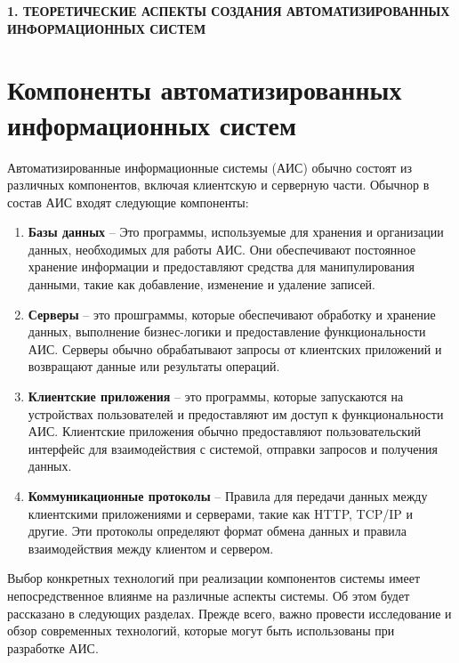 \newpage
\begin{center}
    \textbf{\large 1. ТЕОРЕТИЧЕСКИЕ АСПЕКТЫ СОЗДАНИЯ АВТОМАТИЗИРОВАННЫХ ИНФОРМАЦИОННЫХ СИСТЕМ}
\end{center}



\section{Компоненты автоматизированных информационных систем}
Автоматизированные информационные системы (АИС) обычно состоят из различных компонентов, 
включая клиентскую и серверную части. 
Обычнор в состав АИС входят следующие компоненты:

\begin{enumerate}
    \item \textbf{Базы данных} -- Это программы, используемые для хранения и организации данных, необходимых для работы АИС. 
    Они обеспечивают постоянное хранение информации и предоставляют средства для манипулирования данными, 
    такие как добавление, изменение и удаление записей.
    
    \item \textbf{Серверы} -- это прошграммы, которые обеспечивают обработку и хранение данных, 
    выполнение бизнес-логики и предоставление функциональности АИС. 
    Серверы обычно обрабатывают запросы от клиентских приложений и возвращают данные или результаты операций.
    
    \item \textbf{Клиентские приложения} -- это программы, которые запускаются на устройствах пользователей и предоставляют им доступ к функциональности АИС. 
    Клиентские приложения обычно предоставляют пользовательский интерфейс для взаимодействия с системой, 
    отправки запросов и получения данных.
    
    \item \textbf{Коммуникационные протоколы} -- Правила для передачи данных между клиентскими приложениями и серверами, такие как HTTP, TCP/IP и другие. 
    Эти протоколы определяют формат обмена данных и правила взаимодействия между клиентом и сервером.
\end{enumerate}

Выбор конкретных технологий при реализации компонентов системы имеет непосредственное влиянме на различные аспекты системы. Об этом будет рассказано в следующих разделах.
Прежде всего, важно провести исследование и обзор современных технологий, которые могут быть использованы при разработке АИС.



